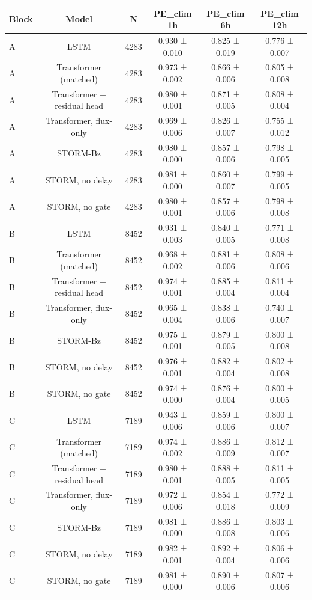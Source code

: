 \begin{tabular}{lccccc}
\toprule
Block & Model & N & PE\_clim 1h & PE\_clim 6h & PE\_clim 12h \\
\midrule
A & LSTM & 4283 & 0.930 ± 0.010 & 0.825 ± 0.019 & 0.776 ± 0.007 \\
A & Transformer (matched) & 4283 & 0.973 ± 0.002 & 0.866 ± 0.006 & 0.805 ± 0.008 \\
A & Transformer + residual head & 4283 & 0.980 ± 0.001 & 0.871 ± 0.005 & 0.808 ± 0.004 \\
A & Transformer, flux-only & 4283 & 0.969 ± 0.006 & 0.826 ± 0.007 & 0.755 ± 0.012 \\
A & STORM-Bz & 4283 & 0.980 ± 0.000 & 0.857 ± 0.006 & 0.798 ± 0.005 \\
A & STORM, no delay & 4283 & 0.981 ± 0.000 & 0.860 ± 0.007 & 0.799 ± 0.005 \\
A & STORM, no gate & 4283 & 0.980 ± 0.001 & 0.857 ± 0.006 & 0.798 ± 0.008 \\
B & LSTM & 8452 & 0.931 ± 0.003 & 0.840 ± 0.005 & 0.771 ± 0.008 \\
B & Transformer (matched) & 8452 & 0.968 ± 0.002 & 0.881 ± 0.006 & 0.808 ± 0.006 \\
B & Transformer + residual head & 8452 & 0.974 ± 0.001 & 0.885 ± 0.004 & 0.811 ± 0.004 \\
B & Transformer, flux-only & 8452 & 0.965 ± 0.004 & 0.838 ± 0.006 & 0.740 ± 0.007 \\
B & STORM-Bz & 8452 & 0.975 ± 0.001 & 0.879 ± 0.005 & 0.800 ± 0.008 \\
B & STORM, no delay & 8452 & 0.976 ± 0.001 & 0.882 ± 0.004 & 0.802 ± 0.008 \\
B & STORM, no gate & 8452 & 0.974 ± 0.000 & 0.876 ± 0.004 & 0.800 ± 0.005 \\
C & LSTM & 7189 & 0.943 ± 0.006 & 0.859 ± 0.006 & 0.800 ± 0.007 \\
C & Transformer (matched) & 7189 & 0.974 ± 0.002 & 0.886 ± 0.009 & 0.812 ± 0.007 \\
C & Transformer + residual head & 7189 & 0.980 ± 0.001 & 0.888 ± 0.005 & 0.811 ± 0.005 \\
C & Transformer, flux-only & 7189 & 0.972 ± 0.006 & 0.854 ± 0.018 & 0.772 ± 0.009 \\
C & STORM-Bz & 7189 & 0.981 ± 0.000 & 0.886 ± 0.008 & 0.803 ± 0.006 \\
C & STORM, no delay & 7189 & 0.982 ± 0.001 & 0.892 ± 0.004 & 0.806 ± 0.006 \\
C & STORM, no gate & 7189 & 0.981 ± 0.000 & 0.890 ± 0.006 & 0.807 ± 0.006 \\
\bottomrule
\end{tabular}
